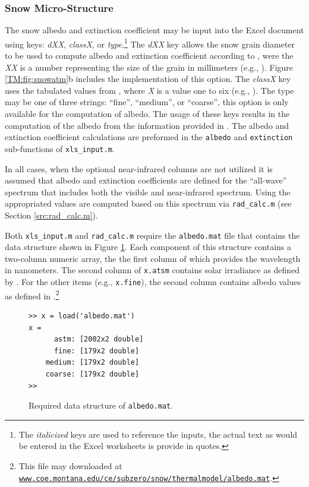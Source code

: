 \subsubsection{Snow Micro-Structure} The snow albedo and extinction coefficient may be input into the Excel document using keys: \emph{dXX}, \emph{classX}, or \emph{type}.\footnote{The \emph{italicized} keys are used to reference the inputs, the actual text as would be entered in the Excel worksheets is provide in quotes.}  The \emph{dXX} key allows the snow grain diameter to be used to compute albedo and extinction coefficient according to \citet[Eq. 2.25, p. 56]{armstrong2008}, were the \emph{XX} is a number representing the size of the grain in millimeters (e.g., ).  Figure \ref{TM:fig:snowatm}b includes the implementation of this option. The \emph{classX} key uses the tabulated values from \citet[Tab. 2.6]{armstrong2008}, where \emph{X} is a value one to six (e.g., ).  The type may be one of three strings: ``fine'', ``medium'', or ``coarse'', this option is only available for the computation of albedo.  The usage of these keys results in the computation of the albedo from the information provided in \citet{baldridge2009}.  The albedo and extinction coefficient calculations are preformed in the \texttt{albedo} and \texttt{extinction} sub-functions of \texttt{xls\_input.m}.

In all cases, when the optional near-infrared columns are not utilized it is assumed that albedo and extinction coefficients are defined for the ``all-wave'' spectrum that includes both the visible and near-infrared spectrum.  Using \citet{ASTMg173} the appropriated values are computed based on this spectrum via \texttt{rad\_calc.m} (see Section \ref{src:rad_calc.m}).

Both \texttt{xls\_input.m} and \texttt{rad\_calc.m} require the \texttt{albedo.mat} file that contains the data structure shown in Figure \ref{TM:fig:albedo}.  Each component of this structure contains a two-column numeric array, the the first column of which provides the wavelength in nanometers.  The second column of \texttt{x.atsm} contains solar irradiance as defined by \citet{ASTMg173}.  For the other items (e.g., \texttt{x.fine}), the second column contains albedo values as defined in \citet{baldridge2009}.\footnote{This file may downloaded at \href{http://www.coe.montana.edu/ce/subzero/snow/thermalmodel/albedo.mat}{\nolinkurl{www.coe.montana.edu/ce/subzero/snow/thermalmodel/albedo.mat}}.}

\begin{figure}[ht!]
\begin{singlespaced}\begin{lstlisting}[style=figure]
>> x = load('albedo.mat')
x = 
      astm: [2002x2 double]
      fine: [179x2 double]
    medium: [179x2 double]
    coarse: [179x2 double]
>> 
\end{lstlisting}\end{singlespaced}
\caption{Required data structure of \texttt{albedo.mat}.}
\label{TM:fig:albedo}
\end{figure}

